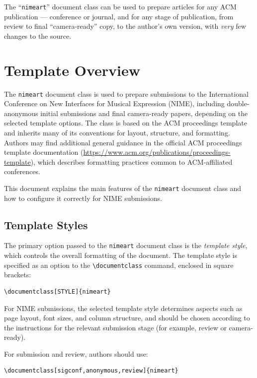 \documentclass[sigconf]{nimeart}
\begin{document}
The ``\verb|nimeart|'' document class can be used to prepare articles
for any ACM publication --- conference or journal, and for any stage
of publication, from review to final ``camera-ready'' copy, to the
author's own version, with {\itshape very} few changes to the source.

\section{Template Overview}

The \texttt{nimeart} document class is used to prepare submissions to the
International Conference on New Interfaces for Musical Expression (NIME),
including double-anonymous initial submissions and final camera-ready
papers, depending on the selected template options. The class is based on
the ACM proceedings template and inherits many of its conventions for
layout, structure, and formatting. Authors may find additional general
guidance in the official ACM proceedings template documentation
(\url{https://www.acm.org/publications/proceedings-template}), which
describes formatting practices common to ACM-affiliated conferences.

This document explains the main features of the \texttt{nimeart} document
class and how to configure it correctly for NIME submissions.

\subsection{Template Styles}

The primary option passed to the \texttt{nimeart} document class is the
\emph{template style}, which controls the overall formatting of the
document. The template style is specified as an option to the
\verb|\documentclass| command, enclosed in square brackets:

\begin{verbatim}
\documentclass[STYLE]{nimeart}
\end{verbatim}

For NIME submissions, the selected template style determines aspects such
as page layout, font sizes, and column structure, and should be chosen
according to the instructions for the relevant submission stage (for
example, review or camera-ready).

For submission and review, authors should use:
\begin{verbatim}
\documentclass[sigconf,anonymous,review]{nimeart}
\end{verbatim}
\end{document}
